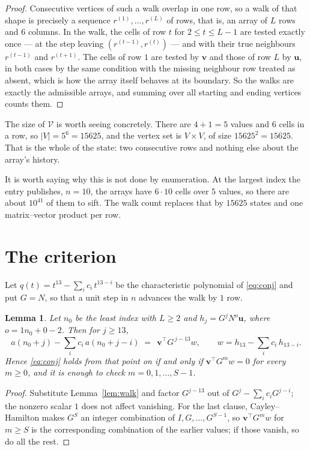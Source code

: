 \documentclass[11pt,a4paper]{article}
\theoremstyle{plain}
\newtheorem{lemma}[theorem]{Lemma}
\theoremstyle{definition}
\begin{document}
\begin{proof}
Consecutive vertices of such a walk overlap in one row, so a walk of that shape is
precisely a sequence $r^{(1)},\dots,r^{(L)}$ of rows, that is, an array of $L$ rows
and $6$ columns. In the walk, the cells of row $t$ for $2\le t\le L-1$ are tested
exactly once --- at the step leaving $(r^{(t-1)},r^{(t)})$ --- and with their true
neighbours $r^{(t-1)}$ and $r^{(t+1)}$. The cells of row $1$ are tested by
$\mathbf{v}$ and those of row $L$ by $\mathbf{u}$, in both cases by the same condition
with the missing neighbour row treated as absent, which is how the array itself behaves at
its boundary. So the walks are exactly the admissible arrays, and summing over all starting
and ending vertices counts them.
\end{proof}


The size of $\mathcal V$ is worth seeing concretely. There are $4+1=5$ values
and $6$ cells in a row, so $|V|=5^{6}=15625$, and the vertex set is
$V\times V$, of size $15625^2=15625$. That is the whole of the state: two consecutive
rows and nothing else about the array's history.

It is worth saying why this is not done by enumeration. At the largest index the entry
publishes, $n=10$, the arrays have $6\cdot10$ cells over
$5$ values, so there are about $10^{41}$ of them to sift. The
walk count replaces that by $15625$ states and one matrix--vector product per row.
\section{The criterion}

Let $q(t)=t^{13}-\sum_i c_i\,t^{13-i}$ be the characteristic polynomial of
\eqref{eq:conj} and put $G=N$, so that a unit step in $n$ advances the walk by
$1$ row.

\begin{lemma}\label{lem:crit}
Let $n_0$ be the least index with $L\ge2$ and $h_j=G^{j}N^{o}\mathbf{u}$, where
$o=1n_0+0-2$. Then for $j\ge13$,
\[
a(n_0+j)-\sum_i c_i\,a(n_0+j-i)\;=\;\,\mathbf{v}^{\!\top}G^{\,j-13}w,
\qquad w=h_{13}-\sum_i c_i\,h_{13-i} .
\]
Hence \eqref{eq:conj} holds from that point on if and only if
$\mathbf{v}^{\!\top}G^{m}w=0$ for every $m\ge0$, and it is enough to check
$m=0,1,\dots,S-1$.
\end{lemma}

\begin{proof}
Substitute Lemma~\ref{lem:walk} and factor $G^{j-13}$ out of
$G^{j}-\sum_ic_iG^{j-i}$; the nonzero scalar $1$ does not affect
vanishing. For the last clause, Cayley--Hamilton makes $G^{S}$ an integer combination of
$I,G,\dots,G^{S-1}$, so $\mathbf{v}^{\!\top}G^{m}w$ for $m\ge S$ is the corresponding
combination of the earlier values; if those vanish, so do all the rest.
\end{proof}
\end{document}
